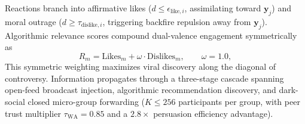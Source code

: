 \documentclass[a4paper,fleqn]{cas-dc}
\begin{document}
Reactions branch into affirmative likes ($d \le \epsilon_{\mathrm{like}, i}$, assimilating toward $\mathbf{y}_j$) and moral outrage ($d \ge \tau_{\mathrm{dislike}, i}$, triggering backfire repulsion away from $\mathbf{y}_j$). Algorithmic relevance scores compound dual-valence engagement symmetrically as
\begin{equation}
    R_m = \mathrm{Likes}_m + \omega \cdot \mathrm{Dislikes}_m, \qquad \omega = 1.0,
    \label{eq:methods_relevance}
\end{equation}
This symmetric weighting maximizes viral discovery along the diagonal of controversy. Information propagates through a three-stage cascade spanning open-feed broadcast injection, algorithmic recommendation discovery, and dark-social closed micro-group forwarding ($K \le 256$ participants per group, with peer trust multiplier $\tau_{\text{WA}} = 0.85$ and a $2.8\times$ persuasion efficiency advantage).
\end{document}
